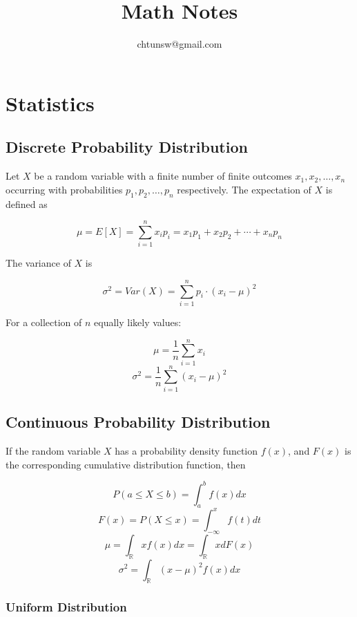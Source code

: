 \documentclass{article}
\title{Math Notes}
\author{chtunsw@gmail.com}
\date{}
\begin{document}
\maketitle

\clearpage

\tableofcontents{}

\clearpage

\section{Statistics}

\subsection{Discrete Probability Distribution}

\noindent Let \(X\) be a random variable with a finite number of finite outcomes \( x_{1},  x_{2}, \ldots, x_{n}\) occurring with probabilities \(p_{1}, p_{2}, \ldots, p_{n}\) respectively. The expectation of \(X\) is defined as

\[\mu = E[X] = \sum_{i=1}^{n}x_{i} p_{i} = x_{1} p_{1} + x_{2} p_{2} + \cdots  + x_{n} p_{n}\]

\noindent The variance of \(X\) is

\[\sigma^{2} = Var(X) = \sum_{i=1}^{n}p_{i} \cdot (x_{i} - \mu)^{2}\]

\noindent For a collection of \(n\) equally likely values:

\[\mu = \frac {1}{n} \sum_{i=1}^{n} x_{i}\]
\[\sigma^{2} = \frac {1}{n} \sum_{i=1}^{n} (x_{i} - \mu)^{2}\]

\subsection{Continuous Probability Distribution}

\noindent If the random variable \(X\) has a probability density function \(f(x)\), and \(F(x)\) is the corresponding cumulative distribution function, then

\[P(a \leq X \leq b) = \int_{a}^{b} f(x)dx\]
\[F(x) = P(X \leq x) = \int_{-\infty}^{x} f(t)dt\]
\[\mu =\int_{\mathbb{R}} x f(x) dx = \int_{\mathbb{R}} x dF(x)\]
\[\sigma^{2} = \int_{\mathbb{R}}(x - \mu)^{2} f(x) dx\]

\subsubsection{Uniform Distribution}
\end{document}
